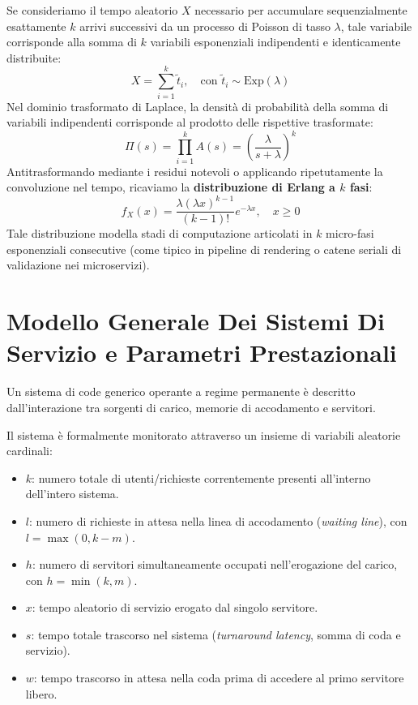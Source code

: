 \documentclass[11pt, a4paper]{article}
\begin{document}
Se consideriamo il tempo aleatorio $X$ necessario per accumulare sequenzialmente esattamente $k$ arrivi successivi da un processo di Poisson di tasso $\lambda$, tale variabile corrisponde alla somma di $k$ variabili esponenziali indipendenti e identicamente distribuite:
\[
    X = \sum_{i=1}^{k} \tilde{t}_i, \quad \text{con } \tilde{t}_i \sim \text{Exp}(\lambda)
\]
Nel dominio trasformato di Laplace, la densità di probabilità della somma di variabili indipendenti corrisponde al prodotto delle rispettive trasformate:
\[
    \Pi(s) = \prod_{i=1}^k A(s) = \left( \frac{\lambda}{s + \lambda} \right)^k
\]
Antitrasformando mediante i residui notevoli o applicando ripetutamente la convoluzione nel tempo, ricaviamo la \textbf{distribuzione di Erlang a $k$ fasi}:
\[
    \boxed{f_X(x) = \frac{\lambda (\lambda x)^{k-1}}{(k - 1)!} e^{-\lambda x}, \quad x \ge 0}
\]
Tale distribuzione modella stadi di computazione articolati in $k$ micro-fasi esponenziali consecutive (come tipico in pipeline di rendering o catene seriali di validazione nei microservizi).

\newpage


\section{Modello Generale Dei Sistemi Di Servizio e Parametri Prestazionali}

Un sistema di code generico operante a regime permanente è descritto dall'interazione tra sorgenti di carico, memorie di accodamento e servitori.


Il sistema è formalmente monitorato attraverso un insieme di variabili aleatorie cardinali:
\begin{itemize}[leftmargin=*]
    \item $k$: numero totale di utenti/richieste correntemente presenti all'interno dell'intero sistema.
    \item $l$: numero di richieste in attesa nella linea di accodamento (\emph{waiting line}), con $l = \max(0, k - m)$.
    \item $h$: numero di servitori simultaneamente occupati nell'erogazione del carico, con $h = \min(k, m)$.
    \item $x$: tempo aleatorio di servizio erogato dal singolo servitore.
    \item $s$: tempo totale trascorso nel sistema (\emph{turnaround latency}, somma di coda e servizio).
    \item $w$: tempo trascorso in attesa nella coda prima di accedere al primo servitore libero.
\end{itemize}
\end{document}
